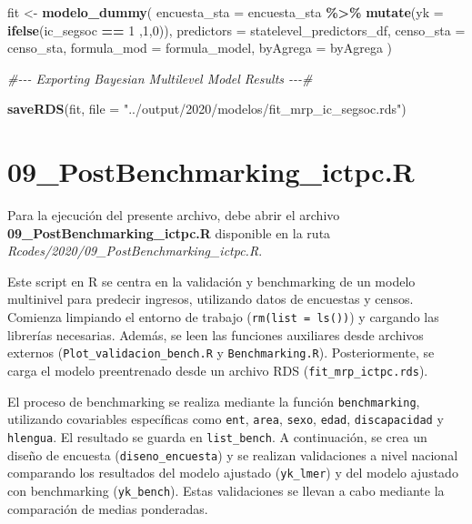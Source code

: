 \documentclass[
  12pt,
]{book}
\newenvironment{Shaded}{\begin{snugshade}}{\end{snugshade}}
\newcommand{\AttributeTok}[1]{\textcolor[rgb]{0.13,0.29,0.53}{#1}}
\newcommand{\CommentTok}[1]{\textcolor[rgb]{0.56,0.35,0.01}{\textit{#1}}}
\newcommand{\DecValTok}[1]{\textcolor[rgb]{0.00,0.00,0.81}{#1}}
\newcommand{\FunctionTok}[1]{\textcolor[rgb]{0.13,0.29,0.53}{\textbf{#1}}}
\newcommand{\NormalTok}[1]{#1}
\newcommand{\OtherTok}[1]{\textcolor[rgb]{0.56,0.35,0.01}{#1}}
\newcommand{\SpecialCharTok}[1]{\textcolor[rgb]{0.81,0.36,0.00}{\textbf{#1}}}
\newcommand{\StringTok}[1]{\textcolor[rgb]{0.31,0.60,0.02}{#1}}
\begin{document}
\begin{Shaded}
\begin{Highlighting}[]
\NormalTok{fit }\OtherTok{\textless{}{-}} \FunctionTok{modelo\_dummy}\NormalTok{(}
  \AttributeTok{encuesta\_sta =}\NormalTok{ encuesta\_sta }\SpecialCharTok{\%\textgreater{}\%}  \FunctionTok{mutate}\NormalTok{(}\AttributeTok{yk =} \FunctionTok{ifelse}\NormalTok{(ic\_segsoc }\SpecialCharTok{==} \DecValTok{1}\NormalTok{ ,}\DecValTok{1}\NormalTok{,}\DecValTok{0}\NormalTok{)),}
  \AttributeTok{predictors =}\NormalTok{ statelevel\_predictors\_df,}
  \AttributeTok{censo\_sta =}\NormalTok{ censo\_sta,}
  \AttributeTok{formula\_mod =}\NormalTok{ formula\_model,}
  \AttributeTok{byAgrega =}\NormalTok{ byAgrega}
\NormalTok{)}

\CommentTok{\#{-}{-}{-} Exporting Bayesian Multilevel Model Results {-}{-}{-}\#}

\FunctionTok{saveRDS}\NormalTok{(fit, }\AttributeTok{file =} \StringTok{"../output/2020/modelos/fit\_mrp\_ic\_segsoc.rds"}\NormalTok{)}
\end{Highlighting}
\end{Shaded}

\hypertarget{postbenchmarking_ictpc.r}{%
\chapter*{09\_PostBenchmarking\_ictpc.R}\label{postbenchmarking_ictpc.r}}

Para la ejecución del presente archivo, debe abrir el archivo \textbf{09\_PostBenchmarking\_ictpc.R} disponible en la ruta \emph{Rcodes/2020/09\_PostBenchmarking\_ictpc.R}.

Este script en R se centra en la validación y benchmarking de un modelo multinivel para predecir ingresos, utilizando datos de encuestas y censos. Comienza limpiando el entorno de trabajo (\texttt{rm(list\ =\ ls())}) y cargando las librerías necesarias. Además, se leen las funciones auxiliares desde archivos externos (\texttt{Plot\_validacion\_bench.R} y \texttt{Benchmarking.R}). Posteriormente, se carga el modelo preentrenado desde un archivo RDS (\texttt{fit\_mrp\_ictpc.rds}).

El proceso de benchmarking se realiza mediante la función \texttt{benchmarking}, utilizando covariables específicas como \texttt{ent}, \texttt{area}, \texttt{sexo}, \texttt{edad}, \texttt{discapacidad} y \texttt{hlengua}. El resultado se guarda en \texttt{list\_bench}. A continuación, se crea un diseño de encuesta (\texttt{diseno\_encuesta}) y se realizan validaciones a nivel nacional comparando los resultados del modelo ajustado (\texttt{yk\_lmer}) y del modelo ajustado con benchmarking (\texttt{yk\_bench}). Estas validaciones se llevan a cabo mediante la comparación de medias ponderadas.
\end{document}
